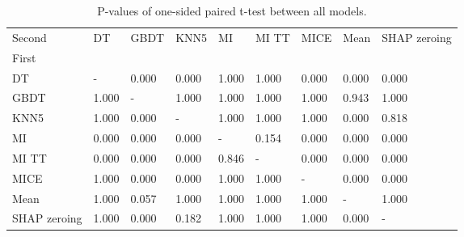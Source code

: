 \begin{table}
\centering
\caption{P-values of one-sided paired t-test between all models. }
\label{tab:pvalues}
\begin{tabular}{lllllllll}
\toprule
Second &     DT &   GBDT &   KNN5 &     MI &  MI TT &   MICE &   Mean & SHAP zeroing \\
First        &        &        &        &        &        &        &        &              \\
\midrule
DT           &      - &  0.000 &  0.000 &  1.000 &  1.000 &  0.000 &  0.000 &        0.000 \\
GBDT         &  1.000 &      - &  1.000 &  1.000 &  1.000 &  1.000 &  0.943 &        1.000 \\
KNN5         &  1.000 &  0.000 &      - &  1.000 &  1.000 &  1.000 &  0.000 &        0.818 \\
MI           &  0.000 &  0.000 &  0.000 &      - &  0.154 &  0.000 &  0.000 &        0.000 \\
MI TT        &  0.000 &  0.000 &  0.000 &  0.846 &      - &  0.000 &  0.000 &        0.000 \\
MICE         &  1.000 &  0.000 &  0.000 &  1.000 &  1.000 &      - &  0.000 &        0.000 \\
Mean         &  1.000 &  0.057 &  1.000 &  1.000 &  1.000 &  1.000 &      - &        1.000 \\
SHAP zeroing &  1.000 &  0.000 &  0.182 &  1.000 &  1.000 &  1.000 &  0.000 &            - \\
\bottomrule
\end{tabular}
\end{table}

